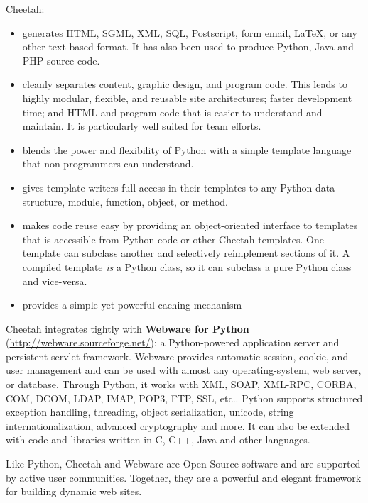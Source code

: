Cheetah:
\begin{itemize}        
\item generates HTML, SGML, XML, SQL, Postscript, form email, LaTeX, or any
     other text-based format.  It has also been used to produce Python, Java
     and PHP source code.
     
\item cleanly separates content, graphic design, and program code.  This leads
     to highly modular, flexible, and reusable site architectures; faster
     development time; and HTML and program code that is easier to understand
     and maintain. It is particularly well suited for team efforts.
     
\item blends the power and flexibility of Python with a simple template language
     that non-programmers can understand.
     
\item gives template writers full access in their templates to any Python data
     structure, module, function, object, or method.
     
\item makes code reuse easy by providing an object-oriented interface to
     templates that is accessible from Python code or other Cheetah templates.
     One template can subclass another and selectively reimplement sections of
     it.  A compiled template {\em is} a Python class, so it can subclass a
     pure Python class and vice-versa.
     
\item provides a simple yet powerful caching mechanism 

\end{itemize}   

Cheetah integrates tightly with {\bf Webware for Python}
(\url{http://webware.sourceforge.net/}): a Python-powered application server and
persistent servlet framework. Webware provides automatic session, cookie, and
user management and can be used with almost any operating-system, web server, or
database. Through Python, it works with XML, SOAP, XML-RPC, CORBA, COM, DCOM,
LDAP, IMAP, POP3, FTP, SSL, etc.. Python supports structured exception handling,
threading, object serialization, unicode, string internationalization, advanced
cryptography and more. It can also be extended with code and libraries written
in C, C++, Java and other languages.

Like Python, Cheetah and Webware are Open Source software and are supported by
active user communities.  Together, they are a powerful and elegant framework
for building dynamic web sites. 

